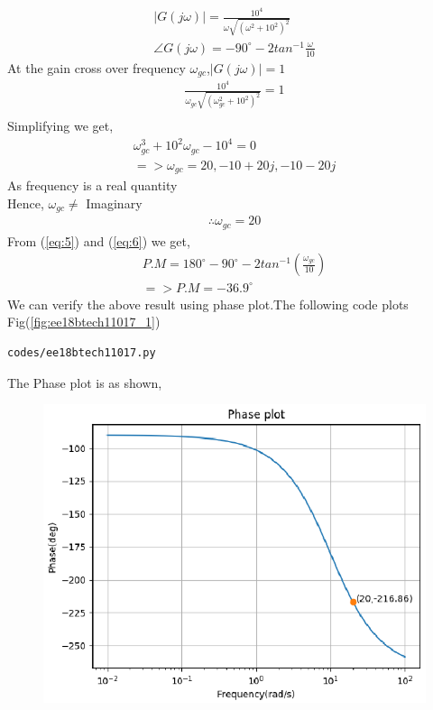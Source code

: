 \begin{enumerate}[label=\thesection.\arabic*.,ref=\thesection.\theenumi]
\begin{align}
|G(j\omega)|=\frac{10^{4}}{\omega \sqrt{(\omega^{2}+10^{2})^{2}}} \\
\angle G(j\omega)=-90^{\circ}-2tan^{-1}\frac{\omega}{10} \label{eq:5} 
\end{align}
At the gain cross over frequency $\omega_{gc}$,$|G(j\omega)|=1$
\\
\begin{align}
\frac{10^{4}}{\omega_{gc} \sqrt{(\omega_{gc}^{2}+10^{2})^{2}}}=1 \\
\end{align}
Simplifying we get,
\begin{align}
\omega_{gc}^{3}+10^{2}\omega_{gc}-10^{4}=0 \\
=> \omega_{gc}=20,-10+20j,-10-20j
\end{align}
As frequency is a real quantity
\\Hence, $\omega_{gc} \neq$ Imaginary
\begin{align}
\therefore  \omega_{gc} =20   \label{eq:6} 
\end{align}
From (\ref{eq:5}) and (\ref{eq:6}) we get,
\begin{align}
P.M=180^{\circ}-90^{\circ}-2tan^{-1}(\frac{\omega_{gc}}{10}) \\
=> P.M=-36.9^{\circ}
\end{align}
We can verify the above result using phase plot.The following code plots Fig(\ref{fig:ee18btech11017_1})
\begin{lstlisting}
codes/ee18btech11017.py
\end{lstlisting}
The Phase plot is as shown,
\begin{figure}[!h]
  \includegraphics[width=\columnwidth]{./figs/ee18btech11017/ee18btech11017_1.eps}

\end{figure}
\end{enumerate}
